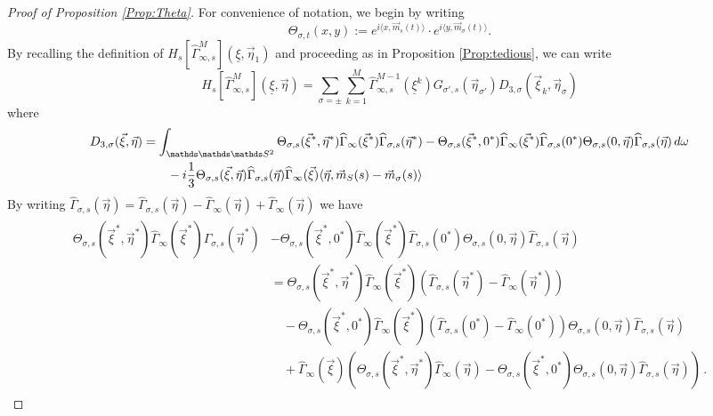 \documentclass{article}
\newcommand\uxi{{\underline \xi}}
\newcommand\vxi{{\vec \xi}}
\newcommand\veta{{\vec \eta}}
\begin{document}
\begin{proof}[Proof of Proposition \ref{Prop:Theta}]
For convenience of notation, we begin by writing
\[
\Theta_{\sigma,t}(x,y) := e^{i\langle x, \vec m_s(t)\rangle} \cdot e^{i\langle y, \vec m_\sigma(t)\rangle}.
\]
By recalling the definition of $H_s[\widehat \Gamma^M_{\infty,s}](\uxi,\veta_{1})$ and proceeding as in Proposition 
\ref{Prop:tedious}, we can write
\[
H_s[\widehat \Gamma^M_{\infty,s}](\uxi,\veta)=\sum_{\sigma=\pm}\sum_{k=1}^M \widehat \Gamma_{\infty,s}^{M - 
1}(\uxi^k) G_{\sigma',s}(\veta_{\sigma'})D_{3,\sigma}(\vxi_k,\veta_{\sigma})
\]
where
\[
\begin{aligned}\label{eq:firstexpansion}
D_{3,\sigma}(\vxi,\veta)&= 
\int_{\mathds
\mathds
\mathds S^2} \Theta_{\sigma, s}(\vxi^*, \veta^*) \widehat \Gamma_{\infty}(\vxi^*) \widehat\Gamma_{\sigma, s}(\veta^*) 
- 
\Theta_{\sigma,s}(\vxi^*, 0^*) \widehat\Gamma_{\infty}(\vxi^*) \widehat\Gamma_{\sigma, s}(0^*) \Theta_{\sigma, s}(0, 
\veta) \widehat\Gamma_{\sigma, s}(\veta) \, d\omega 
\\
&\quad\quad- 
i\frac 1 3 \Theta_{\sigma, s}(\vxi, \veta) \widehat \Gamma_{\sigma, s}(\veta)\widehat\Gamma_{\infty}(\vxi)\langle 
\veta, \vec m_S(s) - \vec m_\sigma(s)\rangle
\end{aligned}
\]
By writing 
$
\widehat \Gamma_{\sigma, s}(\veta) = \widehat \Gamma_{\sigma, s}(\veta) - \widehat \Gamma_\infty(\veta) + \widehat 
\Gamma_\infty(\veta)
$ 
we have
\begin{align}
\begin{split}\label{eq:secondexpansion}
\Theta_{\sigma, s}(\vxi^*, \veta^*) \widehat \Gamma_{\infty}(\vxi^*) \widehat\Gamma_{\sigma, s}(\veta^*) 
&- 
\Theta_{\sigma,s}(\vxi^*, 0^*) \widehat\Gamma_{\infty}(\vxi^*) \widehat\Gamma_{\sigma, s}(0^*) \Theta_{\sigma, s}(0, 
\veta) \widehat\Gamma_{\sigma, s}(\veta)
\\
&= 
\Theta_{\sigma, s}(\vxi^*, \veta^*) \widehat \Gamma_{\infty}(\vxi^*) \left(\widehat \Gamma_{\sigma, s}(\veta^*) - 
\widehat \Gamma_\infty(\veta^*)\right)
\\
&\quad- 
\Theta_{\sigma,s}(\vxi^*, 0^*) \widehat\Gamma_{\infty}(\vxi^*) \left(\widehat \Gamma_{\sigma, s}(0^*) - \widehat 
\Gamma_\infty(0^*)\right) \Theta_{\sigma, s}(0, \veta) \widehat\Gamma_{\sigma, s}(\veta)
\\
&\quad+
\widehat \Gamma_{\infty}(\vxi)\left(\Theta_{\sigma, s}(\vxi^*, \veta^*) \widehat\Gamma_{\infty}(\veta)
- 
\Theta_{\sigma,s}(\vxi^*, 0^*) \Theta_{\sigma, s}(0, \veta) \widehat\Gamma_{\sigma, s}(\veta) \right) \, .
\end{split}

\end{align}
\end{proof}
\end{document}
